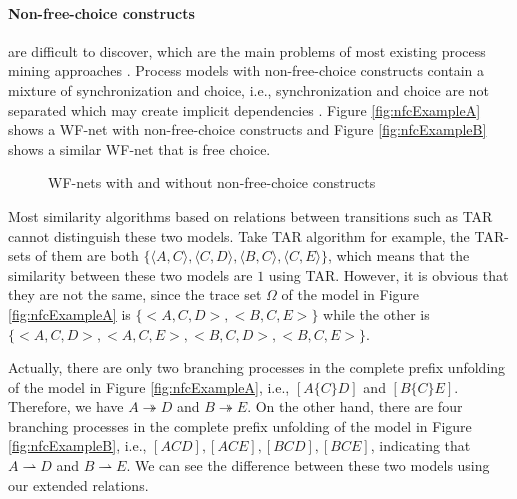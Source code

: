 \documentclass{llncs}
\begin{document}
\paragraph{Non-free-choice constructs}\label{par:nfc} 
are difficult to discover, which are the main problems of most existing process mining approaches \cite{de2003workflow}. Process models with non-free-choice constructs contain a mixture of synchronization and choice, i.e., synchronization and choice are not separated which may create implicit dependencies \cite{wen2007mining}. Figure \ref{fig:nfcExampleA} shows a WF-net with non-free-choice constructs and Figure \ref{fig:nfcExampleB} shows a similar WF-net that is free choice.

\begin{figure}[ht]
\centering
{}
\hspace{0.5cm}
\caption{WF-nets with and without non-free-choice constructs\label{fig:nfcExample}}
\end{figure}

Most similarity algorithms based on relations between transitions such as TAR cannot distinguish these two models. Take TAR algorithm for example, the TAR-sets of them are both $\{\langle A,C\rangle, \langle C,D\rangle, \langle B,C\rangle, \langle C,E\rangle\}$, which means that the similarity between these two models are $1$ using TAR. However, it is obvious that they are not the same, since the trace set $\Omega$ of the model in Figure \ref{fig:nfcExampleA} is $\{<A,C,D>,<B,C,E>\}$ while the other is $\{<A,C,D>,<A,C,E>,<B,C,D>,<B,C,E>\}$.

Actually, there are only two branching processes in the complete prefix unfolding of the model in Figure \ref{fig:nfcExampleA}, i.e., $[A\{C\}D]$ and $[B\{C\}E]$. Therefore, we have $A\twoheadrightarrow D$ and $B\twoheadrightarrow E$. On the other hand, there are four branching processes in the complete prefix unfolding of the model in Figure \ref{fig:nfcExampleB}, i.e., $[ACD],[ACE],[BCD],[BCE]$, indicating that $A\rightharpoonup D$ and $B\rightharpoonup E$. We can see the difference between these two models using our extended relations.
\end{document}
